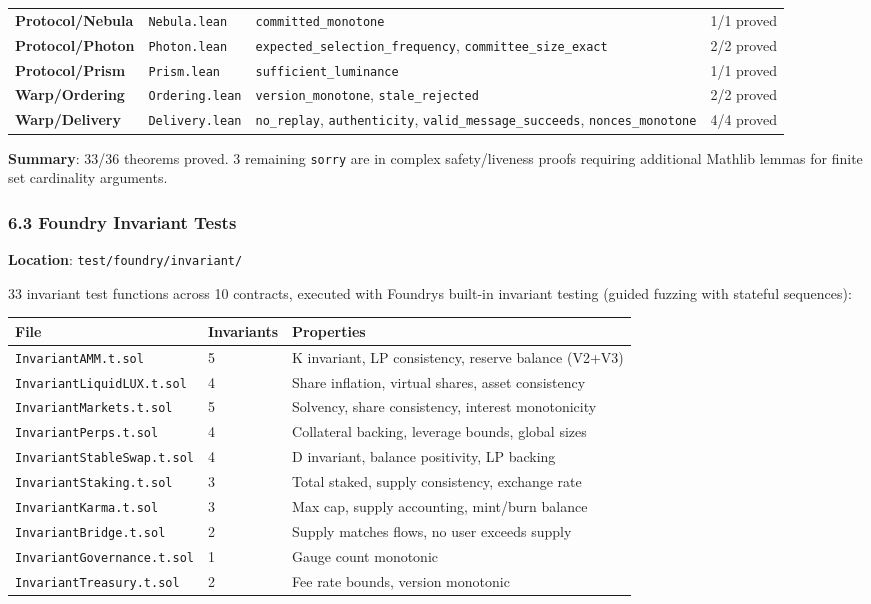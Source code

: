 \documentclass[
]{article}
\newcounter{none} %
\begin{document}
{\begin{longtable}[]{@{}llll@{}}
\textbf{Protocol/Nebula} & \texttt{Nebula.lean} &
\texttt{committed\_monotone} & 1/1 proved \\
\textbf{Protocol/Photon} & \texttt{Photon.lean} &
\texttt{expected\_selection\_frequency}, \texttt{committee\_size\_exact}
& 2/2 proved \\
\textbf{Protocol/Prism} & \texttt{Prism.lean} &
\texttt{sufficient\_luminance} & 1/1 proved \\
\textbf{Warp/Ordering} & \texttt{Ordering.lean} &
\texttt{version\_monotone}, \texttt{stale\_rejected} & 2/2 proved \\
\textbf{Warp/Delivery} & \texttt{Delivery.lean} & \texttt{no\_replay},
\texttt{authenticity}, \texttt{valid\_message\_succeeds},
\texttt{nonces\_monotone} & 4/4 proved \\
\end{longtable}
}

\textbf{Summary}: 33/36 theorems proved. 3 remaining \texttt{sorry} are
in complex safety/liveness proofs requiring additional Mathlib lemmas
for finite set cardinality arguments.

\subsubsection{6.3 Foundry Invariant
Tests}\label{63-foundry-invariant-tests}

\textbf{Location}: \texttt{test/foundry/invariant/}

33 invariant test functions across 10 contracts, executed with
Foundry\textquotesingle s built-in invariant testing (guided fuzzing
with stateful sequences):

{\def\LTcaptype{none} %
\begin{longtable}[]{@{}lll@{}}
\toprule\noalign{}
File & Invariants & Properties \\
\midrule\noalign{}
\endhead
\bottomrule\noalign{}
\endlastfoot
\texttt{InvariantAMM.t.sol} & 5 & K invariant, LP consistency, reserve
balance (V2+V3) \\
\texttt{InvariantLiquidLUX.t.sol} & 4 & Share inflation, virtual shares,
asset consistency \\
\texttt{InvariantMarkets.t.sol} & 5 & Solvency, share consistency,
interest monotonicity \\
\texttt{InvariantPerps.t.sol} & 4 & Collateral backing, leverage bounds,
global sizes \\
\texttt{InvariantStableSwap.t.sol} & 4 & D invariant, balance
positivity, LP backing \\
\texttt{InvariantStaking.t.sol} & 3 & Total staked, supply consistency,
exchange rate \\
\texttt{InvariantKarma.t.sol} & 3 & Max cap, supply accounting,
mint/burn balance \\
\texttt{InvariantBridge.t.sol} & 2 & Supply matches flows, no user
exceeds supply \\
\texttt{InvariantGovernance.t.sol} & 1 & Gauge count monotonic \\
\texttt{InvariantTreasury.t.sol} & 2 & Fee rate bounds, version
monotonic \\
\end{longtable}
}
\end{document}
